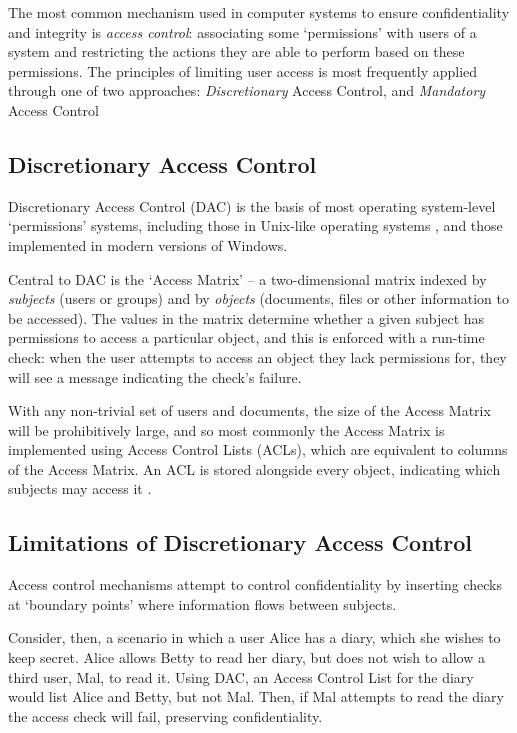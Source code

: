The most common mechanism used in computer systems to ensure confidentiality and integrity is \textit{access control}: associating some `permissions' with users of a system and restricting the actions they are able to perform based on these permissions. The principles of limiting user access is most frequently applied through one of two approaches: \textit{Discretionary} Access Control, and \textit{Mandatory} Access Control

\subsection{Discretionary Access Control}

Discretionary Access Control (DAC) is the basis of most operating system-level `permissions' systems, including those in Unix-like operating systems \cite{sandhu1996role}, and those implemented in modern versions of Windows.

Central to DAC is the `Access Matrix' \cite{sandhu1994access} -- a two-dimensional matrix indexed by \textit{subjects} (users or groups) and by \textit{objects} (documents, files or other information to be accessed). The values in the matrix determine whether a given subject has permissions to access a particular object, and this is enforced with a run-time check: when the user attempts to access an object they lack permissions for, they will see a message indicating the check's failure.

With any non-trivial set of users and documents, the size of the Access Matrix will be prohibitively large, and so most commonly the Access Matrix is implemented using Access Control Lists (ACLs), which are equivalent to columns of the Access Matrix. An ACL is stored alongside every object, indicating which subjects may access it \cite{sandhu1994access}.

\subsection{Limitations of Discretionary Access Control} \label{theory_dac_limitations}

Access control mechanisms attempt to control confidentiality by inserting checks at `boundary points' where information flows between subjects.

Consider, then, a scenario in which a user Alice has a diary, which she wishes to keep secret. Alice allows Betty to read her diary, but does not wish to allow a third user, Mal, to read it. Using DAC, an Access Control List for the diary would list Alice and Betty, but not Mal. Then, if Mal attempts to read the diary the access check will fail, preserving confidentiality.

